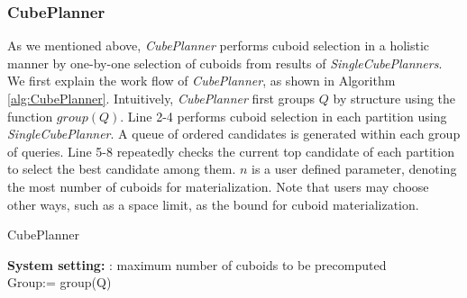 	\subsubsection{CubePlanner}
	\label{CubePlanner}
	
	As we mentioned above, \emph{CubePlanner} performs cuboid selection in a holistic manner by one-by-one selection of cuboids from results of \emph{SingleCubePlanners}. We first explain the work flow of \emph{CubePlanner}, as shown in Algorithm \ref{alg:CubePlanner}. %
	Intuitively, \emph{CubePlanner} first groups $Q$ by structure using the function $group(Q)$. Line 2-4 performs cuboid selection in each partition using \emph{SingleCubePlanner}. A queue of ordered candidates is generated within each group of queries. Line 5-8 repeatedly checks the current top candidate of each partition to select the best candidate among them. $n$ is a user defined parameter, denoting the most number of cuboids for materialization.  Note that users may choose other ways, such as a space limit, as the bound for cuboid materialization.
	
	\begin{algorithm}%
		\label{alg:CubePlanner}
		\caption{CubePlanner}
		\LinesNumbered
		\textbf{System setting:}
		: maximum number of cuboids to be precomputed\\
		Group:= group(Q)\;
		
		
	\end{algorithm}
	
	
	
